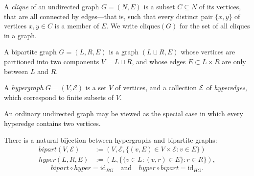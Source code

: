 %


A \emph{clique} of an undirected graph $G = (N,E)$ is a subset $C \subseteq N$ of its vertices, that are all connected by edges---that is, such that every distinct pair $\{x,y\}$ of vertices $x,y \in C$ is a member of $E$.  We write $\mathrm{cliques}(G)$ for the set of all cliques in a graph. 

\begin{defn}
    A bipartite graph $G = (L, R, E)$ is a graph $(L \sqcup R, E)$ whose
    vertices are partiioned into two components $V = L \sqcup R$, 
    and whose edges $E \subset L \times R$ are only between $L$ and $R$. 
\end{defn}



\begin{defn}
    A \emph{hypergraph} $G = (V, \mathcal E)$ is a set $V$ of vertices,
    and a collection $\mathcal E$ of \emph{hyperedges}, which correspond to finite
    subsets of $V$. 
\end{defn}

An ordinary undirected graph may be viewed as the special case in which every hyperedge contains two vertices.

\begin{prop} 
There is a natural bijection between hypergraphs and bipartite graphs:
\def\bigr{\mathit{bipart}}
\def\hygr{\mathit{hyper}}
\begin{align*}
    \bigr(V, \mathcal E) &:=  (V, \mathcal E, \{(v, E) \in V \times \mathcal E : v \in E \} ) \\
    \hygr(L, R, E) &:= (L, \{\{v \in L : (v,r) \in E\} : r \in R\}),
\end{align*}    
    \[
        \bigr \circ \hygr = \mathrm{id}_{BG}
        \quad\text{and}\quad
        \hygr \circ \bigr = \mathrm{id}_{HG}.
    \]
\end{prop}

